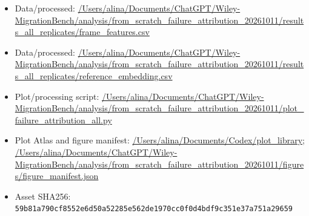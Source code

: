 \begin{itemize}[leftmargin=1.4em,noitemsep]
\item Data/processed: \begingroup\scriptsize\url{/Users/alina/Documents/ChatGPT/Wiley-MigrationBench/analysis/from_scratch_failure_attribution_20261011/results_all_replicates/frame_features.csv}\endgroup
\item Data/processed: \begingroup\scriptsize\url{/Users/alina/Documents/ChatGPT/Wiley-MigrationBench/analysis/from_scratch_failure_attribution_20261011/results_all_replicates/reference_embedding.csv}\endgroup
\item Plot/processing script: \begingroup\scriptsize\url{/Users/alina/Documents/ChatGPT/Wiley-MigrationBench/analysis/from_scratch_failure_attribution_20261011/plot_failure_attribution_all.py}\endgroup
\item Plot Atlas and figure manifest: \begingroup\scriptsize\url{/Users/alina/Documents/Codex/plot_library}\endgroup; \url{/Users/alina/Documents/ChatGPT/Wiley-MigrationBench/analysis/from_scratch_failure_attribution_20261011/figures/figure_manifest.json}
\item Asset SHA256: \texttt{59b81a790cf8552e6d50a52285e562de1970cc0f0d4bdf9c351e37a751a29659}
\end{itemize}
